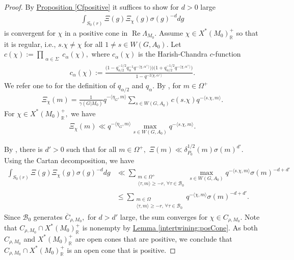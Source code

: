 \documentclass[10pt]{amsart}
\theoremstyle{definition}
\numberwithin{equation}{section}
\numberwithin{equation}{subsection}
\newcommand{\RR}{\mathbb{R}}
\newcommand{\calB}{\mathcal{B}}
\renewcommand{\Re}{\mathop{\mathrm{Re}}}
\begin{document}
\begin{proof}
    By \hyperref[Cfpositive]{Proposition \ref{Cfpositive}} it suffices to show for $d>0$ large
    \begin{align*}
        \int_{S_0(r)} \Xi(g)\Xi_\chi(g)\sigma(g)^{-d}dg
    \end{align*}
    is convergent for $\chi$ in a positive cone in $\Re\Lambda_{M_0}.$ Assume $\chi\in X^\ast(M_0)^+_\RR$ so that it is regular, i.e., $s.\chi\neq \chi$ for all $1\neq s\in W(G,A_0).$ Let $c(\chi):=\prod_{\substack{\alpha\in \Sigma}} c_\alpha(\chi),$ where $c_\alpha(\chi)$ is the Harish-Chandra $c$-function
\begin{align*}
    c_\alpha(\chi):=\frac{\big(1-q_{\alpha/2}^{-1/2}q_\alpha^{-1}q^{-\langle \chi,\alpha^\lor\rangle})\big)\big(1+q^{-1/2}_{\alpha/2}q^{-\langle \chi,\alpha^\lor\rangle}\big)}{1-q^{-2\langle \chi,\alpha^\lor\rangle}}.
\end{align*}
We refer one to \cite[\S 1]{Casselman:unramifiedI} for the definition of $q_{\alpha/2}$ and $q_{\alpha}.$ By \cite[Theorem 4.2]{Casselman:unramifiedI}, for $m\in \Omega^+$
\begin{align*}
    \Xi_{\chi}(m)=\frac{1}{\gamma(G|M_0)}q^{-\langle \eta_G,m\rangle}\sum_{s\in W(G,A_0)} c(s.\chi)q^{-\langle s.\chi,m\rangle}.
\end{align*}
For $\chi\in X^\ast(M_0)_\RR^+,$ we have
\begin{align*}
    \Xi_\chi(m)\ll  q^{-\langle\eta_G,m\rangle}\max_{s\in W(G,A_0)}q^{-\langle s.\chi,m\rangle}.
\end{align*}

 By \cite[Lemme II.1.1]{Waldspurger:Plancherel}, there is $d'>0$ such that for all $m\in \Omega^+,$ $\Xi(m)\ll \delta^{1/2}_{P_0}(m)\sigma(m)^{d'}.$ Using the Cartan decomposition, we have
    \begin{align*}
         \int_{S_0(r)} \Xi(g)\Xi_\chi(g)\sigma(g)^{-d}dg&\ll \sum_{\substack{m\in \Omega^+\\
        \langle \tau,m\rangle\ge -r, \,\forall\tau\in \calB_0}} \max_{s\in W(G,A_0)}q^{-\langle s.\chi,m\rangle}\sigma(m)^{-d+d'}\\
        &\le \sum_{\substack{m\in \Omega\\
        \langle \tau,m\rangle\ge -r, \,\forall\tau\in \calB_0}} q^{-\langle \chi,m\rangle}\sigma(m)^{-d+d'}.
    \end{align*}
     Since $\calB_0$ generates $\overline{C}_{\rho,M_0},$ for $d>d'$ large, the sum converges for $\chi\in C_{\rho,M_0}$. Note that $C_{\rho,M_0}\cap X^\ast(M_0)_\RR^+$ is nonempty by \hyperref[intertwining:posCone]{Lemma \ref{intertwining:posCone}}. As both $C_{\rho,M_0}$ and $X^\ast(M_0)_\RR^+$ are open cones that are positive, we conclude that $C_{\rho,M_0}\cap X^\ast(M_0)_\RR^+$ is an open cone that is positive. 
\end{proof}
\end{document}
